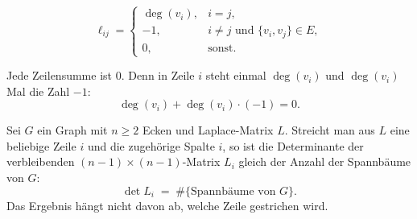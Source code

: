 \begin{merksatz}
\[ \ell_{ij} = \begin{cases}
\deg(v_i), & i = j,\\
-1, & i \neq j \text{ und } \{v_i,v_j\} \in E,\\
0, & \text{sonst.}
\end{cases} \]

Jede Zeilensumme ist $0$. Denn in Zeile $i$ steht einmal $\deg(v_i)$ und $\deg(v_i)$ Mal die Zahl $-1$:
\[ \deg(v_i) + \deg(v_i)\cdot(-1) = 0 . \]

\begin{center}
\begin{minipage}{0.88\textwidth}
\end{minipage}
\end{center}
\end{merksatz}

\begin{merksatz}
Sei $G$ ein Graph mit $n \ge 2$ Ecken und Laplace-Matrix $L$. Streicht man aus $L$ eine beliebige Zeile $i$ und die zugehörige Spalte $i$, so ist die Determinante der verbleibenden $(n-1)\times(n-1)$-Matrix $L_i$ gleich der Anzahl der Spannbäume von $G$:
\[ \det L_i \;=\; \#\{\text{Spannbäume von } G\} . \]
Das Ergebnis hängt nicht davon ab, welche Zeile gestrichen wird.
\end{merksatz}

